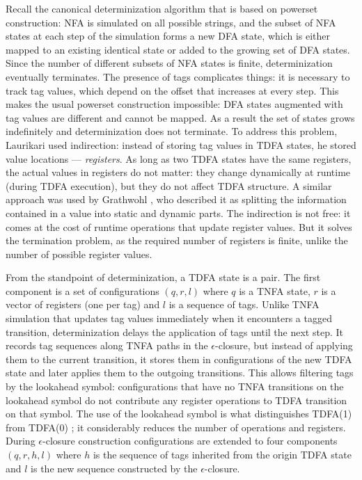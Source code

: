\documentclass[]{article}
\begin{document}
Recall the canonical determinization algorithm that is based on powerset construction:
NFA is simulated on all possible strings,
and the subset of NFA states at each step of the simulation forms a new DFA state,
which is either mapped to an existing identical state or added to the growing set of DFA states.
Since the number of different subsets of NFA states is finite, determinization eventually terminates.
%
The presence of tags complicates things: it is necessary to track tag values, which depend on the offset that increases at every step.
This makes the usual powerset construction impossible: DFA states augmented with tag values are different and cannot be mapped.
As a result the set of states grows indefinitely and determinization does not terminate.
%
To address this problem, Laurikari used indirection: instead of storing tag values in TDFA states, he stored value locations --- \emph{registers}.
As long as two TDFA states have the same registers, the actual values in registers do not matter:
they change dynamically at runtime (during TDFA execution), but they do not affect TDFA structure.
A similar approach was used by Grathwohl \cite{Gra15}, who described it as splitting the information contained in a value into static and dynamic parts.
The indirection is not free: it comes at the cost of runtime operations that update register values.
But it solves the termination problem, as the required number of registers is finite, unlike the number of possible register values.
\medskip

From the standpoint of determinization, a TDFA state is a pair.
The first component is a set of configurations $(q, r, l)$ where
$q$ is a TNFA state,
$r$ is a vector of registers (one per tag) and
$l$ is a sequence of tags.
Unlike TNFA simulation that updates tag values immediately when it encounters a tagged transition,
determinization delays the application of tags until the next step.
%
It records tag sequences along TNFA paths in the $\epsilon$-closure,
but instead of applying them to the current transition,
it stores them in configurations of the new TDFA state
and later applies them to the outgoing transitions.
%
This allows filtering tags by the lookahead symbol:
configurations that have no TNFA transitions on the lookahead symbol
do not contribute any register operations to TDFA transition on that symbol.
The use of the lookahead symbol is what distinguishes TDFA(1) from TDFA(0) \cite{Tro17};
it considerably reduces the number of operations and registers.
During $\epsilon$-closure construction configurations are extended to four components $(q, r, h, l)$
where $h$ is the sequence of tags inherited from the origin TDFA state
and $l$ is the new sequence constructed by the $\epsilon$-closure.
\medskip
\end{document}
